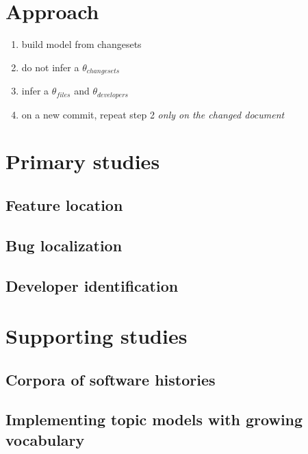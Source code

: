 \section{Approach}\label{approach}

\begin{enumerate}
\itemsep1pt\parskip0pt
\item
  build model from changesets
\item
  do not infer a $\theta_{changesets}$
\item
  infer a $\theta_{files}$ and $\theta_{developers}$
\item
  on a new commit, repeat step 2 \emph{only on the changed document}
\end{enumerate}

\section{Primary studies}\label{primary-studies}

\subsection{Feature location}\label{feature-location}

\subsection{Bug localization}\label{bug-localization}

\subsection{Developer identification}\label{developer-identification}

\section{Supporting studies}\label{supporting-studies}

\subsection{Corpora of software
histories}\label{corpora-of-software-histories}

\subsection{Implementing topic models with growing
vocabulary}\label{implementing-topic-models-with-growing-vocabulary}
